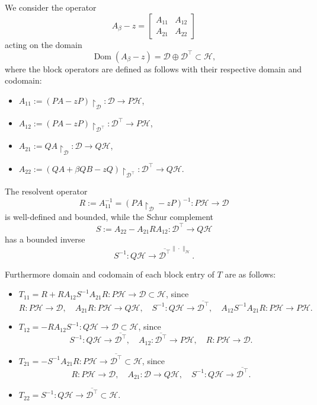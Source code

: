 \documentclass[reqno,12pt,letterpaper]{amsart}
\numberwithin{equation}{section}
\newcommand{\1}{\mathds{1}}
\theoremstyle{definition}
\begin{document}
	\medskip
	
	We consider the operator
	\[
	A_\beta - z =
	\begin{bmatrix}
		A_{11} & A_{12} \\
		A_{21} & A_{22}
	\end{bmatrix}
	\]
	acting on the domain
	\[
	\operatorname{Dom}(A_\beta - z) = \mathcal{D} \oplus \mathcal{D}^\intercal \subset \mathcal{H},
	\]
	where the block operators are defined as follows with their respective domain and codomain:
	\begin{itemize}
		\item \( A_{11} := (PA - zP)\restriction_{\mathcal{D}} \colon \mathcal{D} \to P \mathcal{H} \),
		\item \( A_{12} := (PA - zP)\restriction_{\mathcal{D}^\intercal} \colon \mathcal{D}^\intercal \to P \mathcal{H} \),
		\item \( A_{21} := QA \restriction_{\mathcal{D}} \colon \mathcal{D} \to Q \mathcal{H} \),
		\item \( A_{22} := (QA + \beta QB - zQ)\restriction_{\mathcal{D}^\intercal} \colon \mathcal{D}^\intercal \to Q \mathcal{H} \).
	\end{itemize}
	
	The resolvent operator
	\[
	R := A_{11}^{-1} = (PA \restriction_{\mathcal{D}} - zP)^{-1} \colon P \mathcal{H} \to \mathcal{D}
	\]
	is well-defined and bounded, while the Schur complement
	\[
	S := A_{22} - A_{21} R A_{12} \colon \mathcal{D}^\intercal \to Q \mathcal{H}
	\]
	has a bounded inverse
	\[
	S^{-1} \colon Q \mathcal{H} \to \overline{\mathcal{D}^\intercal}^{\|\cdot\|_{\mathcal{H}}}.
	\]
	
	
	Furthermore domain and codomain  of each block entry of $T$ are as follows:
	
	\begin{itemize}
		\item \( T_{11} = R + R A_{12} S^{-1} A_{21} R \colon P \mathcal{H} \to \mathcal{D} \subset \mathcal{H} \), since
		\[
		R \colon P \mathcal{H} \to \mathcal{D}, \quad
		A_{21} R \colon P \mathcal{H} \to Q \mathcal{H}, \quad
		S^{-1} \colon Q \mathcal{H} \to \overline{\mathcal{D}^\intercal}, \quad
		A_{12} S^{-1} A_{21} R \colon P \mathcal{H} \to P \mathcal{H}.
		\]
		
		\item \( T_{12} = - R A_{12} S^{-1} \colon Q \mathcal{H} \to \mathcal{D} \subset \mathcal{H} \), since
		\[
		S^{-1} \colon Q \mathcal{H} \to \overline{\mathcal{D}^\intercal}, \quad
		A_{12} \colon \overline{\mathcal{D}^\intercal} \to P \mathcal{H}, \quad
		R \colon P \mathcal{H} \to \mathcal{D}.
		\]
		
		\item \( T_{21} = - S^{-1} A_{21} R \colon P \mathcal{H} \to \overline{\mathcal{D}^\intercal} \subset \mathcal{H} \), since
		\[
		R \colon P \mathcal{H} \to \mathcal{D}, \quad
		A_{21} \colon \mathcal{D} \to Q \mathcal{H}, \quad
		S^{-1} \colon Q \mathcal{H} \to \overline{\mathcal{D}^\intercal}.
		\]
		
		\item \( T_{22} = S^{-1} \colon Q \mathcal{H} \to \overline{\mathcal{D}^\intercal} \subset \mathcal{H}. \)
	\end{itemize}
	
\end{document}
